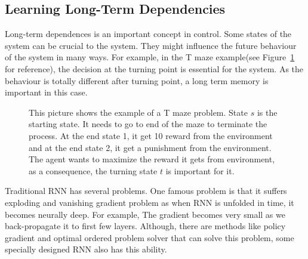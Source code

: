 \documentclass[officiallayout]{tktla}
\begin{document}
\subsection{Learning Long-Term Dependencies}

Long-term dependences is an important concept in control. Some states of the system can be crucial to the system. They might influence the future behaviour of the system in many ways. For example, in the T maze example(see Figure~\ref{tmaze} for reference), the decision at the turning  point is essential for the system. As the behaviour is totally different after turning point, a long term memory is important in this case.
\begin{figure}
\centering
{}

\caption{This picture shows the example of a T maze problem. State $s$ is the starting state. It needs to go to end of the maze to terminate the process. At the end state 1, it get 10 reward from the environment and at the end state 2, it get a punishment from the environment. The agent wants to maximize the reward it gets from environment, as a consequence, the turning state $t$ is important for it.}\label{tmaze}
\end{figure}


Traditional RNN has several problems. One famous problem is that it suffers exploding and vanishing gradient problem as when RNN is unfolded in time, it becomes neurally deep. For example, The gradient becomes very small as we back-propagate it to first few layers. Although, there are methods like policy gradient and optimal ordered problem solver that can solve this problem, some specially designed RNN also has this ability.
\end{document}
